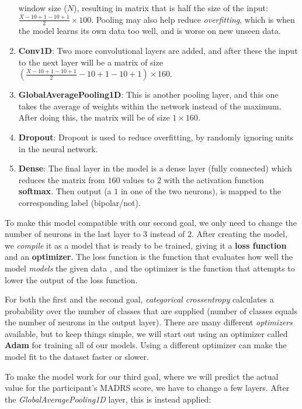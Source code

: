 \begin{enumerate}
        window size ($N$), resulting in matrix that is half the size of the input: $ \frac{X-10+1-10+1}{2} \times 100$. 
        Pooling may also help reduce \textit{overfitting}, which is when the model learns its own data too well, and is worse on new unseen data.
  \item \textbf{Conv1D}: Two more convolutional layers are added, and after these the input to the next layer will be a matrix of size
        $ \left( \frac{X-10+1-10+1}{2}-10+1-10+1 \right) \times 160 $.
  \item \textbf{GlobalAveragePooling1D}: This is another pooling layer, and this one takes the average of weights within the network instead of the maximum.
        After doing this, the matrix will be of size $ 1 \times 160 $.
  \item \textbf{Dropout}: Dropout is used to reduce overfitting, by randomly ignoring units in the neural network. 
  \item \textbf{Dense}: The final layer in the model is a dense layer (fully connected) which reduces the matrix from $160$ values to $2$ with the
        activation function \textbf{softmax}. Then output (a $1$ in one of the two neurons), is mapped to the corresponding label (bipolar/not).
        
\end{enumerate}

To make this model compatible with our second goal, we only need to change the number of neurons in the last layer to $3$ instead of $2$.
After creating the model, we \textit{compile} it as a model that is ready to be trained, giving it a \textbf{loss function} and an \textbf{optimizer}.
The loss function is the function that evaluates how well the model \textit{models} the given data \cite{loss_functions}, and the optimizer is the function that 
attempts to lower the output of the loss function. 

For both the first and the second goal, \textit{categorical crossentropy} calculates a probability over the 
number of classes that are supplied (number of classes equals the number of neurons in the output layer). There are many different \textit{optimizers} available,
but to keep things simple, we will start out using an optimizer called \textbf{Adam} for training all of our models. Using a different optimizer can make the 
model fit to the dataset faster or slower. 

To make the model work for our third goal, where we will predict the actual value for the participant's MADRS score, we have to change a few layers.
After the \textit{GlobalAveragePooling1D} layer, this is instead applied:

